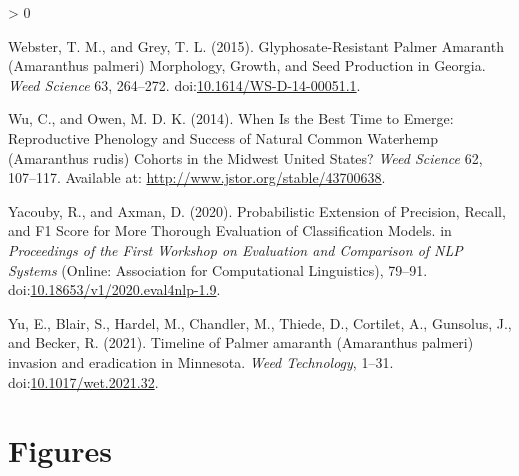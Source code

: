 \documentclass[utf8]{frontiersSCNS}
\newlength{\cslhangindent}
\newenvironment{CSLReferences}[2] %
 {%
  \setlength{\parindent}{0pt}
  \ifodd #1 \everypar{\setlength{\hangindent}{\cslhangindent}}\ignorespaces\fi
  \ifnum #2 > 0
  \setlength{\parskip}{#2\baselineskip}
  \fi
 }%
 {}
\begin{document}
\begin{CSLReferences}{1}{0}
\leavevmode\hypertarget{ref-webster2015}{}%
Webster, T. M., and Grey, T. L. (2015). Glyphosate-{Resistant Palmer
Amaranth} ({Amaranthus} palmeri) {Morphology}, {Growth}, and {Seed
Production} in {Georgia}. \emph{Weed Science} 63, 264--272.
doi:\href{https://doi.org/10.1614/WS-D-14-00051.1}{10.1614/WS-D-14-00051.1}.

\leavevmode\hypertarget{ref-wu2014}{}%
Wu, C., and Owen, M. D. K. (2014). When {Is} the {Best Time} to
{Emerge}: {Reproductive Phenology} and {Success} of {Natural Common
Waterhemp} ({Amaranthus} rudis) {Cohorts} in the {Midwest United
States}? \emph{Weed Science} 62, 107--117. Available at:
\url{http://www.jstor.org/stable/43700638}.

\leavevmode\hypertarget{ref-yacouby2020}{}%
Yacouby, R., and Axman, D. (2020). Probabilistic {Extension} of
{Precision}, {Recall}, and {F1 Score} for {More Thorough Evaluation} of
{Classification Models}. in \emph{Proceedings of the {First Workshop} on
{Evaluation} and {Comparison} of {NLP Systems}} ({Online}: {Association
for Computational Linguistics}), 79--91.
doi:\href{https://doi.org/10.18653/v1/2020.eval4nlp-1.9}{10.18653/v1/2020.eval4nlp-1.9}.

\leavevmode\hypertarget{ref-yu2021}{}%
Yu, E., Blair, S., Hardel, M., Chandler, M., Thiede, D., Cortilet, A.,
Gunsolus, J., and Becker, R. (2021). Timeline of {Palmer} amaranth
({Amaranthus} palmeri) invasion and eradication in {Minnesota}.
\emph{Weed Technology}, 1--31.
doi:\href{https://doi.org/10.1017/wet.2021.32}{10.1017/wet.2021.32}.

\end{CSLReferences}

\newpage

\hypertarget{figures}{%
\section*{Figures}\label{figures}}
\end{document}
